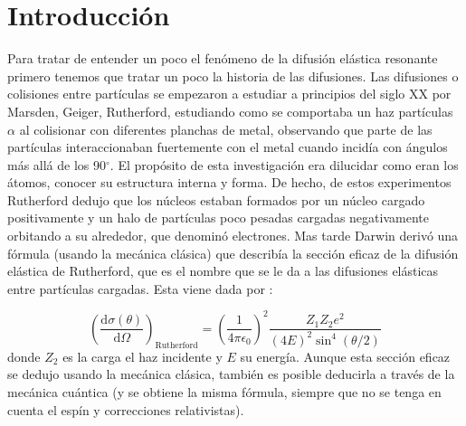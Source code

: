 \documentclass[fleqn,11pt]{SelfArx} %
\affiliation{\textsuperscript{1}\textit{Facultad de Física, Universidad Santiago de Compostela, Galicia, España}} %
\affiliation{*\textbf{Correo del autor}: danielvazquezlago@gmail.com, daniel.vazquez.lago@rai.usc.es} %
\newcommand{\parentesis}[1]{\left( #1  \right)}
\newcommand{\D}{\mathrm{d}}
\newcommand{\derivadas}[2]{\frac{\D #1}{\D #2}}
\begin{document}
\maketitle %

\tableofcontents %

\thispagestyle{empty} %


\setlength{\parskip}{1.5mm} %



\section{Introducción}

Para tratar de entender un poco el fenómeno de la difusión elástica resonante primero tenemos que tratar un poco la historia de las difusiones. Las difusiones o colisiones entre partículas se empezaron a estudiar a principios del siglo XX por Marsden, Geiger, Rutherford, estudiando como se comportaba un haz partículas $\alpha$ al colisionar con diferentes planchas de metal, observando que parte de las partículas interaccionaban fuertemente con el metal cuando incidía con ángulos más allá de los 90$^\circ$. El propósito de esta investigación era dilucidar como eran los átomos, conocer su estructura interna y forma. De hecho, de estos experimentos Rutherford dedujo que los núcleos estaban formados por un núcleo cargado positivamente y un halo de partículas poco pesadas cargadas negativamente orbitando a su alrededor, que denominó electrones. Mas tarde Darwin derivó una fórmula (usando la mecánica clásica) que describía la sección eficaz de la difusión elástica de Rutherford, que es el nombre que se le da a las difusiones elásticas entre partículas cargadas. Esta viene dada por \cite{FNyP}:

\begin{equation}
	\parentesis{\derivadas{\sigma(\theta)}{\Omega}}_{\text{Rutherford}} = \parentesis{\frac{1}{ 4 \pi \epsilon_0}}^2 \frac{Z_1Z_2 e^2}{(4E)^2\sin^4 (\theta/2)}
\end{equation}
donde $Z_2$ es la carga el haz incidente y $E$ su energía. Aunque esta sección eficaz se dedujo usando la mecánica clásica, también es posible deducirla a través de la mecánica cuántica (y se obtiene la misma fórmula, siempre que no se tenga en cuenta el espín y correcciones relativistas).   
\end{document}
